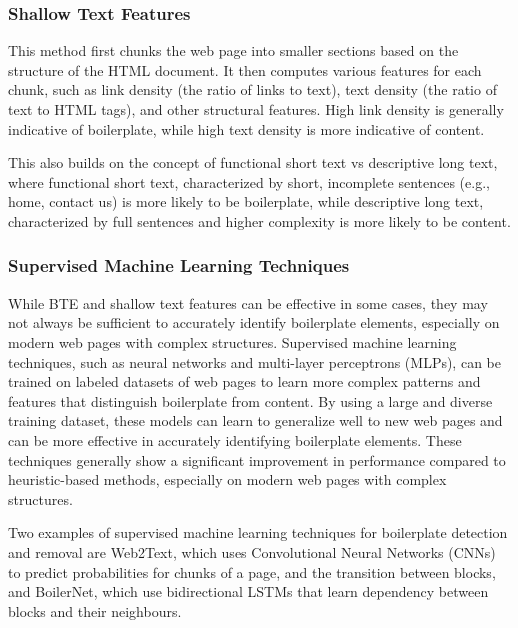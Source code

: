 \subsubsection{Shallow Text Features}\label{subsubsec:shallow-text-features}
This method first chunks the web page into smaller sections based on the structure of the HTML document.
It then computes various features for each chunk, such as link density (the ratio of links to text), text density (the ratio of text to HTML tags), and other structural features.
High link density is generally indicative of boilerplate, while high text density is more indicative of content. \cite{kohlschutter2010boilerplate}

This also builds on the concept of functional short text vs descriptive long text, where functional short text,
characterized by short, incomplete sentences  (e.g., home, contact us) is more likely to be boilerplate,
while descriptive long text, characterized by full sentences and higher complexity is more likely to be content. \cite{kohlschutter2010boilerplate}

\subsubsection{Supervised Machine Learning Techniques}\label{subsubsec:supervised-ml-methods}
While BTE and shallow text features can be effective in some cases, they may not always be sufficient to accurately identify boilerplate elements, especially on modern web pages with complex structures.
Supervised machine learning techniques, such as neural networks and multi-layer perceptrons (MLPs), can be trained on labeled datasets of web pages to learn more complex patterns and features that distinguish boilerplate from content.
By using a large and diverse training dataset, these models can learn to generalize well to new web pages and can be more effective in accurately identifying boilerplate elements.
These techniques generally show a significant improvement in performance compared to heuristic-based methods, especially on modern web pages with complex structures. \cite{schafer2017accurate}

Two examples of supervised machine learning techniques for boilerplate detection and removal are Web2Text\cite{vogels2018web2text},
which uses Convolutional Neural Networks (CNNs) to predict probabilities for chunks of a page, and the transition between blocks,
and BoilerNet\cite{leonhardt2020boilerplate}, which use bidirectional LSTMs that learn dependency between blocks and their neighbours.

